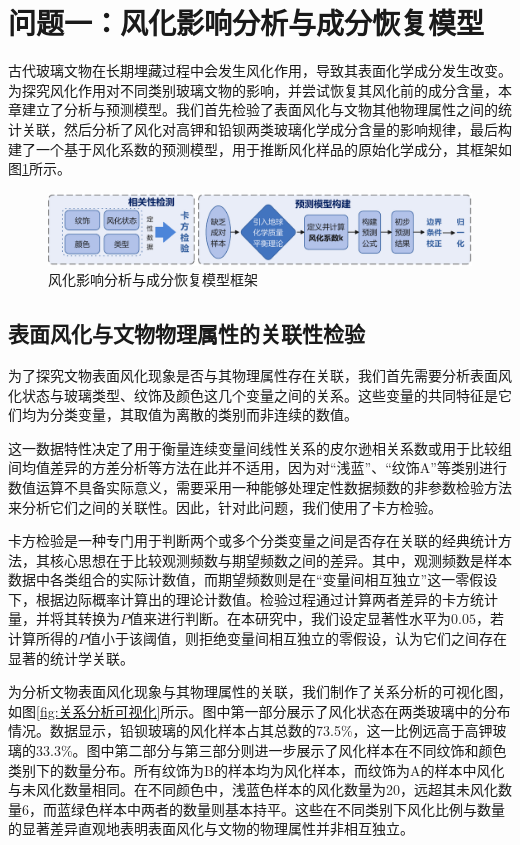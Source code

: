 \section{问题一：风化影响分析与成分恢复模型}

古代玻璃文物在长期埋藏过程中会发生风化作用，导致其表面化学成分发生改变。为探究风化作用对不同类别玻璃文物的影响，并尝试恢复其风化前的成分含量，本章建立了分析与预测模型。我们首先检验了表面风化与文物其他物理属性之间的统计关联，然后分析了风化对高钾和铅钡两类玻璃化学成分含量的影响规律，最后构建了一个基于风化系数的预测模型，用于推断风化样品的原始化学成分，其框架如图\ref{fig:问题一模型框架}所示。

\begin{figure}[H]
	\centering
	\includegraphics[width=\textwidth]{figs/3问题一/第一问框架.pdf}
	\caption{风化影响分析与成分恢复模型框架}
	\label{fig:问题一模型框架}
\end{figure}

\subsection{表面风化与文物物理属性的关联性检验}

为了探究文物表面风化现象是否与其物理属性存在关联，我们首先需要分析表面风化状态与玻璃类型、纹饰及颜色这几个变量之间的关系。这些变量的共同特征是它们均为分类变量，其取值为离散的类别而非连续的数值。

这一数据特性决定了用于衡量连续变量间线性关系的皮尔逊相关系数或用于比较组间均值差异的方差分析等方法在此并不适用，因为对“浅蓝”、“纹饰A”等类别进行数值运算不具备实际意义，需要采用一种能够处理定性数据频数的非参数检验方法来分析它们之间的关联性。因此，针对此问题，我们使用了卡方检验。

卡方检验是一种专门用于判断两个或多个分类变量之间是否存在关联的经典统计方法，其核心思想在于比较观测频数与期望频数之间的差异。其中，观测频数是样本数据中各类组合的实际计数值，而期望频数则是在“变量间相互独立”这一零假设下，根据边际概率计算出的理论计数值。检验过程通过计算两者差异的卡方统计量，并将其转换为$P$值来进行判断。在本研究中，我们设定显著性水平为$0.05$，若计算所得的$P$值小于该阈值，则拒绝变量间相互独立的零假设，认为它们之间存在显著的统计学关联。

为分析文物表面风化现象与其物理属性的关联，我们制作了关系分析的可视化图，如图\ref{fig:关系分析可视化}所示。图中第一部分展示了风化状态在两类玻璃中的分布情况。数据显示，铅钡玻璃的风化样本占其总数的73.5\%，这一比例远高于高钾玻璃的33.3\%。图中第二部分与第三部分则进一步展示了风化样本在不同纹饰和颜色类别下的数量分布。所有纹饰为B的样本均为风化样本，而纹饰为A的样本中风化与未风化数量相同。在不同颜色中，浅蓝色样本的风化数量为20，远超其未风化数量6，而蓝绿色样本中两者的数量则基本持平。这些在不同类别下风化比例与数量的显著差异直观地表明表面风化与文物的物理属性并非相互独立。





